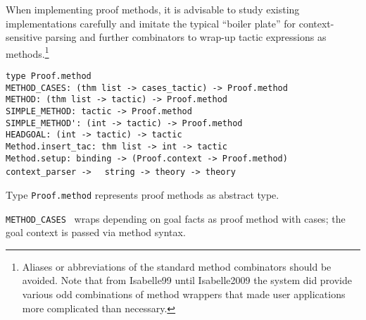 \begin{isabellebody}
\begin{isamarkuptext}
\begin{enumerate}
  \end{enumerate}

  When implementing proof methods, it is advisable to study existing
  implementations carefully and imitate the typical ``boiler plate''
  for context-sensitive parsing and further combinators to wrap-up
  tactic expressions as methods.\footnote{Aliases or abbreviations of
  the standard method combinators should be avoided.  Note that from
  Isabelle99 until Isabelle2009 the system did provide various odd
  combinations of method wrappers that made user applications more
  complicated than necessary.}%
\end{isamarkuptext}%
\isamarkuptrue%
%
\isadelimmlref
%
\endisadelimmlref
%
\isatagmlref
%
\begin{isamarkuptext}%
\begin{mldecls}
  \verb|type Proof.method| \\
  \verb|METHOD_CASES: (thm list -> cases_tactic) -> Proof.method| \\
  \verb|METHOD: (thm list -> tactic) -> Proof.method| \\
  \verb|SIMPLE_METHOD: tactic -> Proof.method| \\
  \verb|SIMPLE_METHOD': (int -> tactic) -> Proof.method| \\
  \verb|HEADGOAL: (int -> tactic) -> tactic| \\
  \verb|Method.insert_tac: thm list -> int -> tactic| \\
  \verb|Method.setup: binding -> (Proof.context -> Proof.method) context_parser ->|\isasep\isanewline%
\verb|  string -> theory -> theory| \\
  \end{mldecls}

  \begin{description}

  \item Type \verb|Proof.method| represents proof methods as
  abstract type.

  \item \verb|METHOD_CASES|~ wraps
   depending on goal facts as proof method with
  cases; the goal context is passed via method syntax.


\end{description}
\end{isamarkuptext}
\end{isabellebody}
